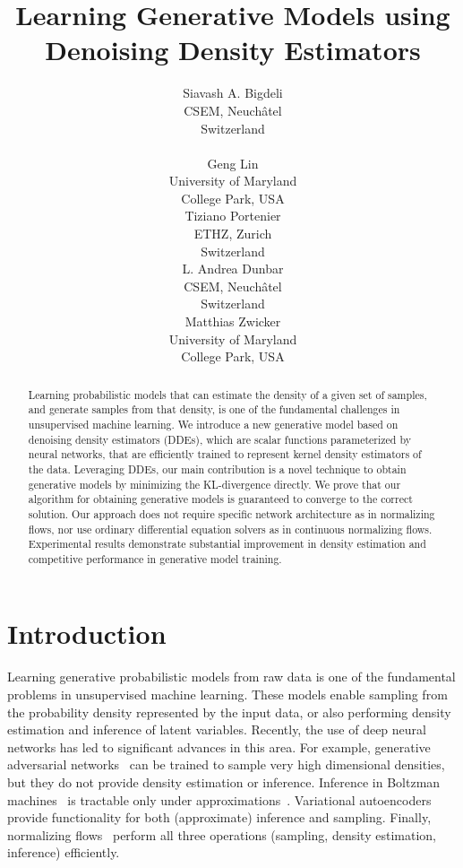 \documentclass{article}
\title{Learning Generative Models using Denoising Density Estimators}
\author{Siavash A. Bigdeli \\
  CSEM, Neuchâtel\\ Switzerland\\
  \\
	\And
	Geng Lin \\
  University of Maryland\\ College Park, USA \\
		\AND
	Tiziano Portenier \\
  ETHZ, Zurich\\ Switzerland \\
	  \And
	L. Andrea Dunbar \\
  CSEM, Neuchâtel\\ Switzerland \\
		\And
	Matthias Zwicker \\
  University of Maryland\\ College Park, USA \\
}
\begin{document}
\maketitle

\begin{abstract}

Learning probabilistic models that can estimate the density of a given set of samples, and generate samples from that density, is one of the fundamental challenges in unsupervised machine learning. We introduce a new generative model based on denoising density estimators (DDEs), which are scalar functions parameterized by neural networks, that are efficiently trained to represent kernel density estimators of the data. Leveraging DDEs, our main contribution is a novel technique to obtain generative models by minimizing the KL-divergence directly. We prove that our algorithm for obtaining generative models is guaranteed to converge to the correct solution. Our approach does not require specific network architecture as in normalizing flows, nor use ordinary differential equation solvers as in continuous normalizing flows. Experimental results demonstrate substantial improvement in density estimation and competitive performance in generative model training.

\end{abstract}

\section{Introduction}
Learning generative probabilistic models from raw data is one of the fundamental problems in unsupervised machine learning. These models enable sampling from the probability density represented by the input data, or also performing density estimation and inference of latent variables. Recently, the use of deep neural networks has led to significant advances in this area. For example, generative adversarial networks~\citep{Goodfellow2014GAN} can be trained to sample very high dimensional densities, but they do not provide density estimation or inference. Inference in Boltzman machines~\citep{salakhutdinov2009deep} is tractable only under approximations~\citep{WELLING200319}. Variational autoencoders~\citep{Kingma2014VAE} provide functionality for both (approximate) inference and sampling. Finally, normalizing flows~\citep{Dinh2014NICE} perform all three operations (sampling, density estimation, inference) efficiently.
\end{document}
